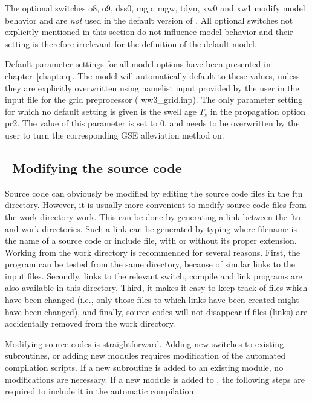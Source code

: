 \noindent
The optional switches {\sc o8}, {\sc o9}, {\sc dss0}, {\sc mgp}, {\sc mgw},
{\sc tdyn}, {\sc xw0} and {\sc xw1} modify model behavior and are {\it not}
used in the default version of \ws. All optional switches not explicitly
mentioned in this section do not influence model behavior and their setting is
therefore irrelevant for the definition of the default model.

Default parameter settings for all model options have been presented in
chapter~\ref{chapt:eq}. The model will automatically default to these values,
unless they are explicitly overwritten using {\F namelist} input provided by
the user in the input file for the grid preprocessor ({\file
ww3\_grid.inp}). The only parameter setting for which no default setting is
given is the swell age $T_s$ in the propagation option {\sc pr2}. The value of
this parameter is set to 0, and needs to be overwritten by the user to turn
the corresponding GSE alleviation method on.


\vssub
\subsection{~Modifying the source code} \label{sec:mod}
\vssub

Source code can obviously be modified by editing the source code files in the
{\dir ftn} directory. However, it is usually more convenient to modify source
code files from the work directory {\dir work}. This can be done by generating
a link between the {\dir ftn} and {\dir work} directories. Such a link can be
generated by typing  where {\code filename} is the name
of a source code or include file, with or without its proper
extension. Working from the work directory is recommended for several
reasons. First, the program can be tested from the same directory, because of
similar links to the input files. Secondly, links to the relevant switch,
compile and link programs are also available in this directory. Third, it
makes it easy to keep track of files which have been changed (i.e., only those
files to which links have been created might have been changed), and finally,
source codes will not disappear if files (links) are accidentally removed from
the work directory.

Modifying source codes is straightforward. Adding new switches to existing
subroutines, or adding new modules requires modification of the automated
compilation scripts. If a new subroutine is added to an existing module, no
modifications are necessary. If a new module is added to \ws, the following
steps are required to include it in the automatic compilation:

